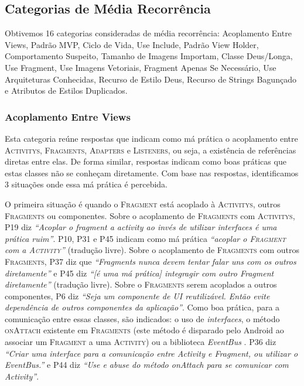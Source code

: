 \subsection{Categorias de M\'edia Recorr\^encia}
Obtivemos 16 categorias consideradas de m\'edia recorr\^encia: Acoplamento Entre Views, Padr\~ao MVP, Ciclo de Vida, Use Include, Padr\~ao View Holder, Comportamento Suspeito, Tamanho de Imagens Importam, Classe Deus/Longa, Use Fragment, Use Imagens Vetoriais, Fragment Apenas Se Necess\'ario, Use Arquiteturas Conhecidas, Recurso de Estilo Deus, Recurso de Strings Bagun\c{c}ado e Atributos de Estilos Duplicados.

\subsubsection{Acoplamento Entre Views}
Esta categoria re\'une respostas que indicam como m\'a pr\'atica o acoplamento entre \textsc{Activitys}, \textsc{Fragments}, \textsc{Adapters} e \textsc{Listeners}, ou seja, a exist\^encia de refer\^encias diretas entre elas. De forma similar, respostas indicam como boas pr\'aticas que estas classes n\~ao se conhe\c{c}am diretamente. Com base nas respostas, identificamos 3 situa\c{c}\~oes onde essa m\'a pr\'atica \'e percebida.

O primeira situa\c{c}\~ao \'e quando o \textsc{Fragment} est\'a acoplado \`a \textsc{Activitys}, outros \textsc{Fragments} ou componentes. Sobre o acoplamento de \textsc{Fragments} com \textsc{Activitys}, P19 diz \textit{``Acoplar o fragment a activity ao inv\'es de utilizar interfaces \'e uma pr\'atica ruim''}. P10, P31 e P45 indicam como m\'a pr\'atica \textit{``acoplar o \textsc{Fragment} com a \textsc{Activity}''} (tradu\c{c}\~ao livre). Sobre o acoplamento de \textsc{Fragments} com outros \textsc{Fragments}, P37 diz que \textit{``Fragments nunca devem tentar falar uns com os outros diretamente''} e P45 diz \textit{``[\'e uma m\'a pr\'atica] integragir com outro Fragment diretamente''} (tradu\c{c}\~ao livre). Sobre o \textsc{Fragments} serem acoplados a outros componentes, P6 diz \textit{``Seja um componente de UI reutiliz\'avel. Ent\~ao evite depend\^encia de outros componentes da aplica\c{c}\~ao''}. Como boa pr\'atica, para a comunica\c{c}\~ao entre essas classes, s\~ao indicados: o uso de \textit{interfaces}, o m\'etodo \textsc{onAttach} existente em \textsc{Fragments} (este m\'etodo \'e disparado pelo Android ao associar um \textsc{Fragment} a uma \textsc{Activity}) ou a biblioteca \textit{EventBus} \cite{EventBusAndroid}. P36 diz \textit{``Criar uma interface para a comunica\c{c}\~ao entre Activity e Fragment, ou utilizar o EventBus.''} e P44 diz \textit{``Use e abuse do m\'etodo onAttach para se comunicar com Activity''}. 

